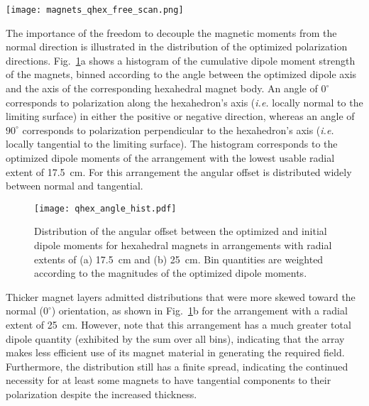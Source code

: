 \documentclass[11pt,onecolumn]{article}
\begin{document}
\begin{figure*}
    \begin{center}
    \texttt{[image: magnets\_qhex\_free\_scan.png]}
    \caption{Renderings of arrangements quadrilaterally-faced hexahedra
             with radial extents of (a) 10 cm, (b) 17.5 cm, and (c) 35 cm.
             The color scale corresponds to the value of $\rho$ obtained
             from an optimization in which the dipole moment's direction
             could vary during the optimization.}
    \label{fig:magnets_qhex_free_scan}
    \end{center}
\end{figure*}

The importance of the freedom to decouple the magnetic moments from the normal
direction is illustrated in the distribution of the optimized polarization
directions. Fig.~\ref{fig:qhex_angle_hist}a shows a histogram of the 
cumulative dipole moment strength of the magnets, binned according to the
angle between the optimized dipole axis and the axis of the corresponding
hexahedral magnet body. An angle of $0^\circ$ corresponds to polarization
along the hexahedron's axis (\textit{i.e.} locally normal to the limiting 
surface) in either the positive or negative direction, whereas an angle of
$90^\circ$ corresponds to polarization perpendicular to the hexahedron's axis
(\textit{i.e.} locally tangential to the limiting surface).
The histogram corresponds to the optimized dipole moments of the arrangement
with the lowest usable radial extent of 17.5~cm. For this arrangement
the angular offset is distributed widely between normal and tangential.

\begin{figure}
    \begin{center}
    \texttt{[image: qhex\_angle\_hist.pdf]}
    \caption{Distribution of the angular offset between the optimized and
             initial dipole moments for hexahedral magnets in arrangements
             with radial extents of (a) 17.5~cm and (b) 25~cm. Bin quantities
             are weighted according to the magnitudes of the optimized dipole
             moments.}
    \label{fig:qhex_angle_hist}
    \end{center}
\end{figure}

Thicker magnet layers admitted distributions that were more skewed toward
the normal ($0^\circ$) orientation, as shown in Fig.~\ref{fig:qhex_angle_hist}b
for the arrangement with a radial extent of 25~cm. However, note that this
arrangement has a much greater total dipole quantity (exhibited by the sum
over all bins), indicating that the array makes less efficient use of
its magnet material in generating the required field. Furthermore, the
distribution still has a finite spread, indicating the continued necessity
for at least some magnets to have tangential components to their polarization
despite the increased thickness.
\end{document}
